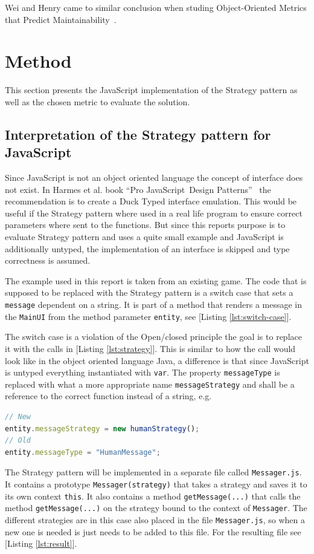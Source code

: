 \documentclass[conference, a4paper]{IEEEtran}
\begin{document}
Wei and Henry came to similar conclusion when studing Object-Oriented Metrics that Predict Maintainability~\cite{bibitem:WeiHenry}.

\section{Method}
This section presents the JavaScript implementation of the Strategy pattern as well as the chosen metric to evaluate the solution.

\subsection{Interpretation of the Strategy pattern for JavaScript}
Since JavaScript is not an object oriented language the concept of interface does not exist. In Harmes et al. book ``Pro JavaScript\texttrademark~Design Patterns''~\cite{bibitem:DiazHarmes} the recommendation is to create a Duck Typed interface emulation. This would be useful if the Strategy pattern where used in a real life program to ensure correct parameters where sent to the functions. But since this reports purpose is to evaluate Strategy pattern and uses a quite small example and JavaScript is additionally untyped, the implementation of an interface is skipped and type correctness is assumed.

The example used in this report is taken from an existing game. The code that is supposed to be replaced with the Strategy pattern is a switch case that sets a \texttt{message} dependent on a string. It is part of a method that renders a message in the \texttt{MainUI} from the method parameter \texttt{entity}, see [Listing \ref{lst:switch-case}].

The switch case is a violation of the Open/closed principle the goal is to replace it with the calls in [Listing \ref{lst:strategy}]. This is similar to how the call would look like in the object oriented language Java, a difference is that since JavaScript is untyped everything instantiated with \texttt{var}. The property \texttt{messageType} is replaced with what a more appropriate name \texttt{messageStrategy} and shall be a reference to the correct function instead of a string, e.g.

\begin{lstlisting}[language=JavaScript]
// New
entity.messageStrategy = new humanStrategy();
// Old
entity.messageType = "HumanMessage";
\end{lstlisting}

The Strategy pattern will be implemented in a separate file called \texttt{Messager.js}. It contains a prototype \texttt{Messager(strategy)} that takes a strategy and saves it to its own context \texttt{this}. It also contains a method \texttt{getMessage(...)} that calls the method \texttt{getMessage(...)} on the strategy bound to the context of \texttt{Messager}. The different strategies are in this case also placed in the file \texttt{Messager.js}, so when a new one is needed is just needs to be added to this file. For the resulting file see [Listing \ref{lst:result}].
\end{document}
